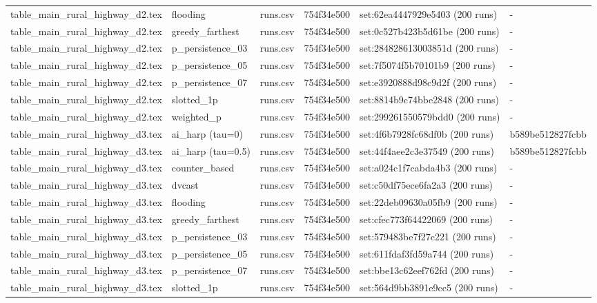 \begin{tabular}{llllll}
table\_main\_rural\_highway\_d2.tex & flooding & runs.csv & 754f34e500 & set:62ea4447929e5403 (200 runs) & - \\
table\_main\_rural\_highway\_d2.tex & greedy\_farthest & runs.csv & 754f34e500 & set:0c527b423b5d61be (200 runs) & - \\
table\_main\_rural\_highway\_d2.tex & p\_persistence\_03 & runs.csv & 754f34e500 & set:284828613003851d (200 runs) & - \\
table\_main\_rural\_highway\_d2.tex & p\_persistence\_05 & runs.csv & 754f34e500 & set:7f5074f5b70101b9 (200 runs) & - \\
table\_main\_rural\_highway\_d2.tex & p\_persistence\_07 & runs.csv & 754f34e500 & set:e3920888d98c9d2f (200 runs) & - \\
table\_main\_rural\_highway\_d2.tex & slotted\_1p & runs.csv & 754f34e500 & set:8814b9c74bbe2848 (200 runs) & - \\
table\_main\_rural\_highway\_d2.tex & weighted\_p & runs.csv & 754f34e500 & set:299261550579bdd0 (200 runs) & - \\
table\_main\_rural\_highway\_d3.tex & ai\_harp (tau=0) & runs.csv & 754f34e500 & set:4f6b7928fc68df0b (200 runs) & b589be512827fcbb \\
table\_main\_rural\_highway\_d3.tex & ai\_harp (tau=0.5) & runs.csv & 754f34e500 & set:44f4aee2c3e37549 (200 runs) & b589be512827fcbb \\
table\_main\_rural\_highway\_d3.tex & counter\_based & runs.csv & 754f34e500 & set:a024c1f7cabda4b3 (200 runs) & - \\
table\_main\_rural\_highway\_d3.tex & dvcast & runs.csv & 754f34e500 & set:c50df75ece6fa2a3 (200 runs) & - \\
table\_main\_rural\_highway\_d3.tex & flooding & runs.csv & 754f34e500 & set:22deb09630a05fb9 (200 runs) & - \\
table\_main\_rural\_highway\_d3.tex & greedy\_farthest & runs.csv & 754f34e500 & set:cfec773f64422069 (200 runs) & - \\
table\_main\_rural\_highway\_d3.tex & p\_persistence\_03 & runs.csv & 754f34e500 & set:579483be7f27c221 (200 runs) & - \\
table\_main\_rural\_highway\_d3.tex & p\_persistence\_05 & runs.csv & 754f34e500 & set:611fdaf3fd59a744 (200 runs) & - \\
table\_main\_rural\_highway\_d3.tex & p\_persistence\_07 & runs.csv & 754f34e500 & set:bbe13c62eef762fd (200 runs) & - \\
table\_main\_rural\_highway\_d3.tex & slotted\_1p & runs.csv & 754f34e500 & set:564d9bb3891e9cc5 (200 runs) & - \\

\end{tabular}
